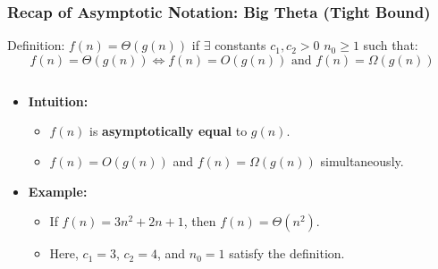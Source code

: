 \begin{frame}
  \frametitle{Recap of Asymptotic Notation: Big Theta (Tight Bound)}

  \begin{block}{Definition:}
          \( f(n) = \Theta(g(n)) \) if $\exists$ constants $c_1, c_2 > 0$ 
          \land $n_0 \geq 1$ such that:
\[
f(n) = \Theta(g(n)) \iff f(n) = O(g(n)) \text{ and } f(n) = \Omega(g(n))
\]
\end{block}
  \begin{columns}

    \begin{column}{0.7\textwidth}
      \begin{itemize}
        \item \textbf{Intuition:}
        \begin{itemize}
            \item \( f(n) \) is \textbf{asymptotically equal} to \( g(n) \).
            \vspace{3pt}
            \item \( f(n) = O(g(n)) \) and \( f(n) = \Omega(g(n)) \) simultaneously.
        \end{itemize}
        \item \textbf{Example:}
        \begin{itemize}
            \item If \( f(n) = 3n^2 + 2n + 1 \), then \( f(n) = \Theta(n^2) \).
            \vspace{3pt}
            \item Here, \( c_1 = 3 \), \( c_2 = 4 \), and \( n_0 = 1 \) satisfy the definition.
        \end{itemize}
      \end{itemize}
    \end{column}


\end{columns}
\end{frame}
